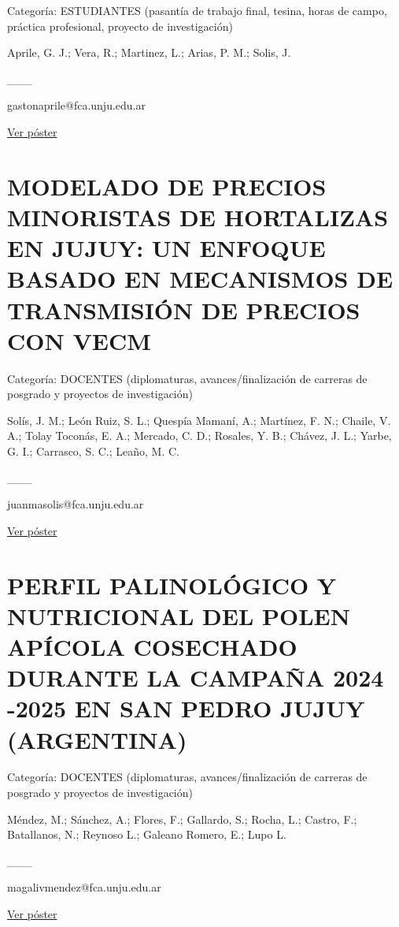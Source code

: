 \documentclass[
  spanish,
  letterpaper,
  DIV=11,
  numbers=noendperiod]{scrreprt}
\begin{document}
Categoría: ESTUDIANTES (pasantía de trabajo final, tesina, horas de
campo, práctica profesional, proyecto de investigación)

Aprile, G. J.; Vera, R.; Martinez, L.; Arias, P. M.; Solis, J.

\_\_\_

gastonaprile@fca.unju.edu.ar

\href{https://drive.google.com/open?id=1HQLviHiXKGN88v3t8g6rx8uI73OxbTIp}{Ver
póster}

\section{MODELADO DE PRECIOS MINORISTAS DE HORTALIZAS EN JUJUY: UN
ENFOQUE BASADO EN MECANISMOS DE TRANSMISIÓN DE PRECIOS CON
VECM}\label{modelado-de-precios-minoristas-de-hortalizas-en-jujuy-un-enfoque-basado-en-mecanismos-de-transmisiuxf3n-de-precios-con-vecm}

Categoría: DOCENTES (diplomaturas, avances/finalización de carreras de
posgrado y proyectos de investigación)

Solís, J. M.; León Ruiz, S. L.; Quespía Mamaní, A.; Martínez, F. N.;
Chaile, V. A.; Tolay Toconás, E. A.; Mercado, C. D.; Rosales, Y. B.;
Chávez, J. L.; Yarbe, G. I.; Carrasco, S. C.; Leaño, M. C.

\_\_\_

juanmasolis@fca.unju.edu.ar

\href{https://drive.google.com/open?id=19_5xcIYDZW9gfPhAsRKD5kDm05lTH46o}{Ver
póster}

\section{PERFIL PALINOLÓGICO Y NUTRICIONAL DEL POLEN APÍCOLA COSECHADO
DURANTE LA CAMPAÑA 2024 -2025 EN SAN PEDRO JUJUY
(ARGENTINA)}\label{perfil-palinoluxf3gico-y-nutricional-del-polen-apuxedcola-cosechado-durante-la-campauxf1a-2024--2025-en-san-pedro-jujuy-argentina}

Categoría: DOCENTES (diplomaturas, avances/finalización de carreras de
posgrado y proyectos de investigación)

Méndez, M.; Sánchez, A.; Flores, F.; Gallardo, S.; Rocha, L.; Castro,
F.; Batallanos, N.; Reynoso L.; Galeano Romero, E.; Lupo L.

\_\_\_

magalivmendez@fca.unju.edu.ar

\href{https://drive.google.com/open?id=1fKgFE_gIkK-pF3f_8D7AlV_3IvLt23Wu}{Ver
póster}
\end{document}
